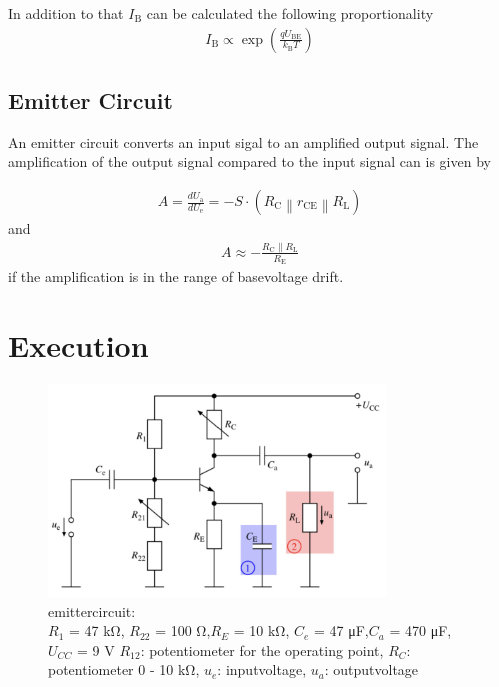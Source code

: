 \documentclass[11pt, a4paper]{article}
\begin{document}
In addition to that $I_{\mathrm{B}}$ can be calculated the following proportionality 
\begin{align}
    I_{\mathrm{B}} \propto \exp \left(\frac{q U_{\mathrm{BE}}}{k_{\mathrm{B}} T}\right)
    \label{eq:Ib_T}
\end{align}

\subsection{Emitter Circuit}
An emitter circuit converts an input sigal to an amplified output signal. The amplification of the output signal compared to the input signal can is given by


\begin{align}
    A=\frac{d U_{\mathrm{a}}}{d U_{\mathrm{e}}}=-S \cdot\left(R_{\mathrm{C}}\left\|r_{\mathrm{CE}}\right\| R_{\mathrm{L}}\right)
    \label{eq:ampEasy}
\end{align}
and 
\begin{align}
A \approx-\frac{R_{\mathrm{C}} \| R_{\mathrm{L}}}{R_{\mathrm{E}}}
\label{eq:ampDrift}
\end{align}
if the amplification is in the range of basevoltage drift.
\section{Execution}
\begin{figure}[h]
    \centering
    \includegraphics[width=0.8\textwidth]{bilder/Emitter circuit.png}
    \caption{emittercircuit:\\
    $R_1$ = 47 \si{\kilo\ohm}, $R_{22}$ = 100 \si{\ohm},$R_E$ = 10 \si{\kilo\ohm}, $C_e$ = 47 \si{\micro\farad},$C_a$ = 470 \si{\micro\farad}, $U_{CC}$ = 9 \si{\volt} 
    $R_{12}$: potentiometer for the operating point, $R_C$: potentiometer 0 - 10 \si{\kilo\ohm}, $u_e$: inputvoltage, $u_a$: outputvoltage
    }
    \label{im:Emcir}
\end{figure}
\end{document}
